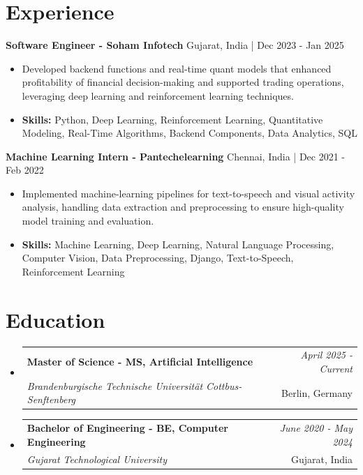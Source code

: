 \documentclass[a4paper,11pt]{article}
\makeatletter
\newcommand{\resumeSubheading}[4]{
\vspace{0.5mm}\item
    \begin{tabular*}{0.98\textwidth}[t]{l@{\extracolsep{\fill}}r}
        \textbf{#1} & \textit{\footnotesize{#4}} \\
        \textit{\footnotesize{#3}} &  \footnotesize{#2}\\
    \end{tabular*}
    \vspace{-2.4mm}
}
\makeatother
\begin{document}
\section{\textbf{Experience}}


\vspace{1mm}
  \textbf{Software Engineer - Soham Infotech} \hfill Gujarat, India | Dec 2023 - Jan 2025
\vspace{-1.5mm} %
\begin{itemize}
  \item Developed backend functions and real-time quant models that enhanced profitability of financial decision-making and supported trading operations, leveraging deep learning and reinforcement learning techniques.

\vspace{-2mm}
  \item \textbf{Skills:} Python, Deep Learning, Reinforcement Learning, Quantitative Modeling, Real-Time Algorithms, Backend Components, Data Analytics, SQL
\end{itemize}

\vspace{1mm}
  \textbf{Machine Learning Intern - Pantechelearning} \hfill Chennai, India | Dec 2021 - Feb 2022
\vspace{-1.5mm} %
\begin{itemize}
  \item Implemented machine-learning pipelines for text-to-speech and visual activity analysis, handling data extraction and preprocessing to ensure high-quality model training and evaluation.
\vspace{-2mm}
  \item \textbf{Skills:} Machine Learning, Deep Learning, Natural Language Processing, Computer Vision, Data Preprocessing, Django, Text-to-Speech, Reinforcement Learning
\end{itemize}\section{\textbf{Education}}
\vspace{-0.4mm}

\begin{itemize}
\resumeSubheading
{Master of Science - MS, Artificial Intelligence }{Berlin, Germany}
{Brandenburgische Technische Universität Cottbus-Senftenberg  }{April 2025 - Current}

\vspace{1.0mm} %
\resumeSubheading
{Bachelor of Engineering - BE, Computer Engineering  }{Gujarat, India}
{Gujarat Technological University }{June 2020 - May 2024}

\end{itemize}
\end{document}
